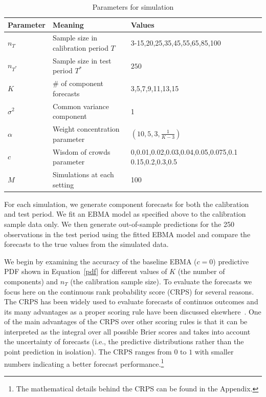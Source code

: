 \documentclass[12pt,fullpage,endnotes]{article}
\begin{document}
\begin{table}
  \caption{Parameters for simulation}
\label{params}
\small
\centering

\vspace{.2cm}
\begin{tabular}{lll}
  \toprule
  Parameter & Meaning & Values \\
  \midrule
  $n_{T}$ & Sample size in calibration period $T$  & 3-15,20,25,35,45,55,65,85,100 \\
  $n_{T^\ast}$ &  Sample size in test period $T^\ast$&$250$\\
  $K$ & \# of component forecasts & 3,5,7,9,11,13,15\\
  $\sigma^2$ & Common variance component & 1 \\
  $\alpha$ & Weight concentration parameter  &$ (10, 5, 3, \frac{1}{K-3})$ \\
 $c$ & Wisdom of crowds parameter & 0,0.01,0.02,0.03,0.04,0.05,0.075,0.1 0.15,0.2,0.3,0.5\\
  $M$ & Simulations at each setting & 100 \\
  \bottomrule
\end{tabular}
\end{table}

For each simulation, we generate component forecasts for both the
calibration and test period. We fit an EBMA model as specified above
to the calibration sample data only. We then generate out-of-sample
predictions for the 250 observations in the test period using the
fitted EBMA model and compare the forecasts to the true values from the
simulated data.  

We begin by examining the accuracy of the baseline EBMA ($c=0$)
predictive PDF shown in Equation~\ref{pdf} for different values of $K$
(the number of components) and $n_{T}$ (the calibration sample size).
To evaluate the forecasts we focus here on the continuous rank
probability score (CRPS) for several reasons. The CRPS has been widely
used to evaluate forecasts of continuos outcomes and its many
advantages as a proper scoring rule have been discussed
elsewhere~\citep{Hersbach:2000,Gneiting_Raftery_2007,GneitingEtAl:2007,brandt:freeman:schrodt:2011}. One
of the main advantages of the CRPS over other scoring rules is that it
can be interpreted as the integral over all possible Brier scores
\citep{Brier:1950} and takes into account the uncertainty of forecasts
(i.e., the predictive distributions rather than the point prediction
in isolation). The CRPS ranges from $0$ to $1$ with smaller numbers
indicating a better forecast performance.\footnote{The mathematical
  details behind the CRPS can be found in the Appendix.}
\end{document}
